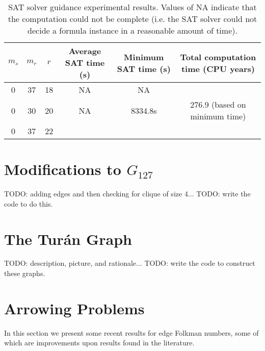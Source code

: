 \documentclass[paper=a4, fontsize=11pt]{scrartcl} %
\begin{document}
\begin{table}
	\caption{SAT solver guidance experimental results. Values of NA indicate that the computation
	could not be complete (i.e. the SAT solver could not decide a formula instance in a reasonable
	amount of time).}
	\begin{tabular}{c | c | c | c | c | c}
		\hline
		$m_s$ & $m_r$ & $r$ & Average SAT time (s) & Minimum SAT time (s) & Total computation time (CPU years)\\ \hline
		0 & 37 & 18 & NA & NA \\ \hline
		0 & 30 & 20 & NA & 8334.8s & 276.9 (based on minimum time) \\ \hline
		0 & 37 & 22 & ~ & ~ & ~ \\
		\hline
	\end{tabular}
	\label{tab:guidanceExperiment}
\end{table}


\section{Modifications to $G_{127}$}
TODO: adding edges and then checking for clique of size 4...
TODO: write the code to do this.

\section{The Tur\'{a}n Graph}
TODO: description, picture, and rationale...
TODO: write the code to construct these graphs.


\section{Arrowing Problems}
In this section we present some recent results for edge Folkman numbers, some of which are improvements
upon results found in the literature.
\end{document}
